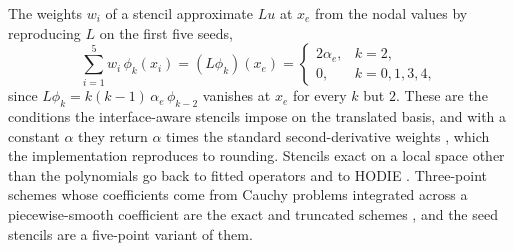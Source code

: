 \documentclass[11pt]{amsart}
\theoremstyle{definition}
\theoremstyle{remark}
\begin{document}
The weights $w_i$ of a stencil approximate $L u$ at $x_e$ from the nodal
values by reproducing $L$ on the first five seeds,
\begin{equation}
  \label{eq:moments}
  \sum_{i=1}^{5} w_i\, \phi_k(x_i) = (L \phi_k)(x_e) =
  \begin{cases} 2 \alpha_e, & k = 2, \\ 0, & k = 0, 1, 3, 4, \end{cases}
\end{equation}
since $L \phi_k = k (k - 1)\, \alpha_e\, \phi_{k-2}$ vanishes at $x_e$ for
every $k$ but $2$. These are the conditions the interface-aware stencils
impose on the translated basis, and with a constant $\alpha$ they return
$\alpha$ times the standard second-derivative weights \cite{Fornberg1988},
which the implementation reproduces to rounding. Stencils exact on a local
space other than the polynomials go back to fitted operators and to HODIE
\cite{AllenSouthwell1955,Ilin1969,LynchRice1980,RoosStynesTobiska2008}.
Three-point schemes whose coefficients come from Cauchy problems
integrated across a piecewise-smooth coefficient are the exact and
truncated schemes \cite{SamarskiiMakarov1990,GavrilyukEtAl2011}, and the
seed stencils are a five-point variant of them.
\end{document}
